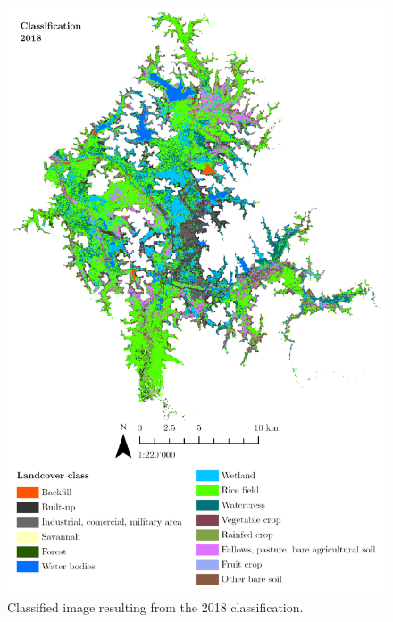 \begin{figure}[H]
    \centering
    \includegraphics[width = 15cm]{figures/classi2018.png}
    \caption{Classified image resulting from the 2018 classification.}
    \label{}
\end{figure}

